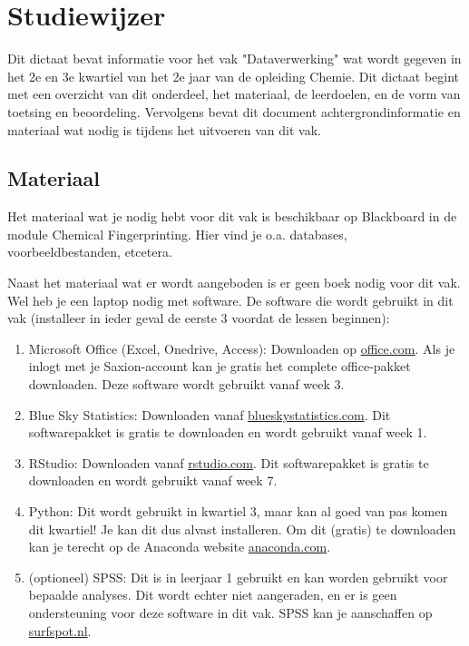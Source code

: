 \chapter{Studiewijzer}

Dit dictaat bevat informatie voor het vak "Dataverwerking" wat wordt gegeven in het 2e en 3e kwartiel van het 2e jaar van de opleiding Chemie. Dit dictaat begint met een overzicht van dit onderdeel, het materiaal, de leerdoelen, en de vorm van toetsing en beoordeling. Vervolgens bevat dit document achtergrondinformatie en materiaal wat nodig is tijdens het uitvoeren van dit vak.


\section{Materiaal}
Het materiaal wat je nodig hebt voor dit vak is beschikbaar op Blackboard in de module Chemical Fingerprinting. Hier vind je o.a. databases, voorbeeldbestanden, etcetera. 

Naast het materiaal wat er wordt aangeboden is er geen boek nodig voor dit vak. Wel heb je een laptop nodig met software. De software die wordt gebruikt in dit vak (installeer in ieder geval de eerste 3 voordat de lessen beginnen):
\begin{enumerate}
    \item Microsoft Office (Excel, Onedrive, Access): Downloaden op \href{https://office.com}{\textsf{office.com}}. Als je inlogt met je Saxion-account kan je gratis het complete office-pakket downloaden. Deze software wordt gebruikt vanaf week 3. 
    \item Blue Sky Statistics: Downloaden vanaf \href{https://www.blueskystatistics.com/}{\textsf{blueskystatistics.com}}. Dit softwarepakket is gratis te downloaden en wordt gebruikt vanaf week 1. 
    \item RStudio: Downloaden vanaf \href{https://rstudio.com/}{\textsf{rstudio.com}}. Dit softwarepakket is gratis te downloaden en wordt gebruikt vanaf week 7.
    \item Python: Dit wordt gebruikt in kwartiel 3, maar kan al goed van pas komen dit kwartiel! Je kan dit dus alvast installeren. Om dit (gratis) te downloaden kan je terecht op de Anaconda website \href{https://www.anaconda.com/distribution/}{anaconda.com}.
    \item (optioneel) SPSS: Dit is in leerjaar 1 gebruikt en kan worden gebruikt voor bepaalde analyses. Dit wordt echter niet aangeraden, en er is geen ondersteuning voor deze software in dit vak. SPSS kan je aanschaffen op \href{https://www.surfspot.nl/}{surfspot.nl}.
\end{enumerate}

